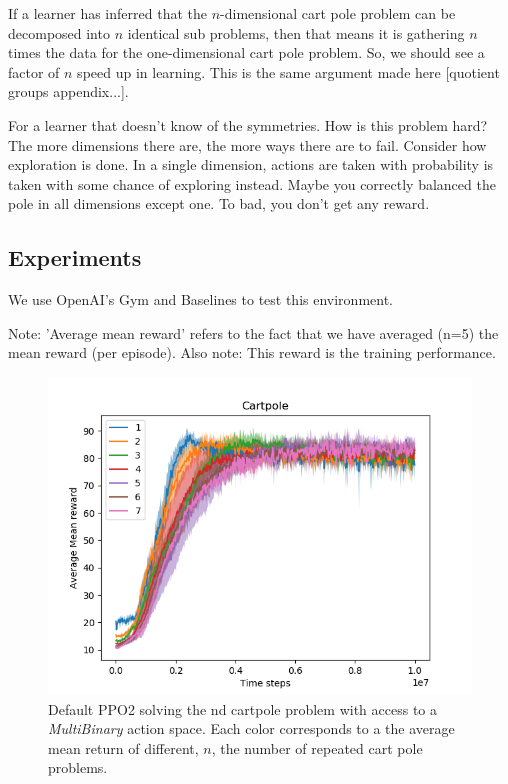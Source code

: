 If a learner has inferred that the $n$-dimensional cart pole problem can be decomposed into $n$ identical sub problems,
then that means it is gathering $n$ times the data for the one-dimensional cart pole problem.
So, we should see a factor of $n$ speed up in learning.
This is the same argument made here [quotient groups appendix...].

For a learner that doesn't know of the symmetries. How is this problem hard?
The more dimensions there are, the more ways there are to fail.
Consider how exploration is done. In a single dimension, actions are taken with probability  is
taken with some chance of exploring instead.
Maybe you correctly balanced the pole in all dimensions except one. To bad, you don't get any reward.

\subsection{Experiments}\label{ndcart-experiments}

We use OpenAI's Gym \cite{Brockman2016} and Baselines \cite{baselines} to test this environment.


Note: 'Average mean reward' refers to the fact that we have averaged (n=5)
the mean reward (per episode). Also note: This reward is the training performance.

\begin{figure}[h!]
  \centering
  \includegraphics[width=1\textwidth,height=0.5\textheight]{../../pictures/figures/multibinary-nd-cart.png}
  \caption{Default PPO2 solving the nd cartpole problem with access to a \textit{MultiBinary} action space. Each color corresponds to a the average mean return of different, $n$, the number of repeated cart pole problems.}
\end{figure}

